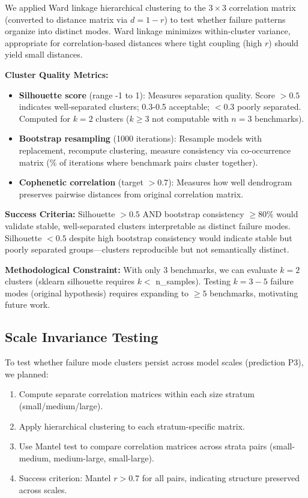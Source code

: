 We applied Ward linkage hierarchical clustering to the $3 \times 3$ correlation matrix (converted to distance matrix via $d = 1 - r$) to test whether failure patterns organize into distinct modes. Ward linkage minimizes within-cluster variance, appropriate for correlation-based distances where tight coupling (high $r$) should yield small distances.

\textbf{Cluster Quality Metrics:}
\begin{itemize}
\item \textbf{Silhouette score} (range -1 to 1): Measures separation quality. Score $> 0.5$ indicates well-separated clusters; 0.3-0.5 acceptable; $<0.3$ poorly separated. Computed for $k=2$ clusters ($k \geq 3$ not computable with $n=3$ benchmarks).
\item \textbf{Bootstrap resampling} (1000 iterations): Resample models with replacement, recompute clustering, measure consistency via co-occurrence matrix (\% of iterations where benchmark pairs cluster together).
\item \textbf{Cophenetic correlation} (target $>0.7$): Measures how well dendrogram preserves pairwise distances from original correlation matrix.
\end{itemize}

\textbf{Success Criteria:} Silhouette $> 0.5$ AND bootstrap consistency $\geq 80\%$ would validate stable, well-separated clusters interpretable as distinct failure modes. Silhouette $< 0.5$ despite high bootstrap consistency would indicate stable but poorly separated groups---clusters reproducible but not semantically distinct.

\textbf{Methodological Constraint:} With only 3 benchmarks, we can evaluate $k=2$ clusters (sklearn silhouette requires $k <$ n\_samples). Testing $k=3-5$ failure modes (original hypothesis) requires expanding to $\geq 5$ benchmarks, motivating future work.

\subsection{Scale Invariance Testing}

To test whether failure mode clusters persist across model scales (prediction P3), we planned:
\begin{enumerate}
\item Compute separate correlation matrices within each size stratum (small/medium/large).
\item Apply hierarchical clustering to each stratum-specific matrix.
\item Use Mantel test to compare correlation matrices across strata pairs (small-medium, medium-large, small-large).
\item Success criterion: Mantel $r > 0.7$ for all pairs, indicating structure preserved across scales.
\end{enumerate}

